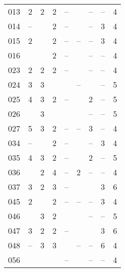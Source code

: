 \begin{center}
\begin{supertabular}{l c c c c c c c c}
013  & 2 & 2 & 2 & -- &  & -- & -- & 4 \\
014  & -- &  & 2 & -- &  & -- & 3 & 4 \\
015  & 2 &  & 2 & -- & -- & -- & 3 & 4 \\
016  &  &  & 2 & -- &  & -- & -- & 4 \\
023  & 2 & 2 & 2 & -- &  & -- & -- & 4 \\
024  & 3 & 3 &  &  & -- &  & -- & 5 \\
025  & 4 & 3 & 2 & -- &  & 2 & -- & 5 \\
026  &  & 3 &  &  &  & -- & -- & 5 \\
027  & 5 & 3 & 2 & -- & -- & 3 & -- & 4 \\
034  & -- &  & 2 & -- &  & -- & 3 & 4 \\
035  & 4 & 3 & 2 & -- &  & 2 & -- & 5 \\
036  &  & 2 & 4 & -- & 2 & -- & -- & 4 \\
037  & 3 & 2 & 3 & -- &  &  & 3 & 6 \\
045  & 2 &  & 2 & -- & -- & -- & 3 & 4 \\
046  &  & 3 & 2 &  &  & -- & -- & 5 \\
047  & 3 & 2 & 2 & -- &  &  & 3 & 6 \\
048  & -- & 3 & 3 &  & -- & -- & 6 & 4 \\
056  &  &  &  & -- &  & -- & -- & 4 \\


\end{supertabular}
\end{center}
